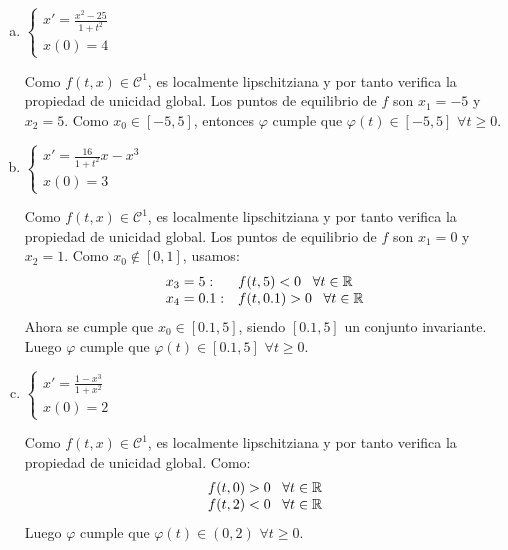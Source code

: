 \documentclass[12pt]{article}
\theoremstyle{definition}
\theoremstyle{remark}
\begin{document}
\begin{enumerate}[(a)]
\item $
\left\{
\begin{array}{l}
x'=\frac{x^2-25}{1+t^2}\\
x(0)=4
\end{array}
\right.
$

Como $f(t,x)\in\mathcal{C}^1$, es localmente lipschitziana y por tanto verifica la propiedad de unicidad global. Los puntos de equilibrio de $f$ son $x_1=-5$ y $x_2=5$. Como $x_0\in[-5,5]$, entonces $\varphi$ cumple que $\varphi(t)\in[-5,5]$ $\forall t\geq 0$.
\item $
\left\{
\begin{array}{l}
x'=\frac{16}{1+t^2}x-x^3\\
x(0)=3
\end{array}
\right.
$

Como $f(t,x)\in\mathcal{C}^1$, es localmente lipschitziana y por tanto verifica la propiedad de unicidad global. Los puntos de equilibrio de $f$ son $x_1=0$ y $x_2=1$. Como $x_0\notin[0,1]$, usamos:
\[
\begin{array}{ll}
x_3=5:& f(t,5)<0 \;\;\; \forall t\in\mathbb{R}\\
x_4=0.1: & f(t,0.1)>0 \;\;\; \forall t\in\mathbb{R}
\end{array}
\]
Ahora se cumple que $x_0\in[0.1,5]$, siendo $[0.1,5]$ un conjunto invariante. Luego $\varphi$ cumple que $\varphi(t)\in[0.1,5]$ $\forall t\geq 0$.

\item $
\left\{
\begin{array}{l}
x'=\frac{1-x^3}{1+x^2}\\
x(0)=2
\end{array}
\right.
$

Como $f(t,x)\in\mathcal{C}^1$, es localmente lipschitziana y por tanto verifica la propiedad de unicidad global. Como:
\[
\begin{array}{ll}
f(t,0)>0 \;\;\; \forall t\in\mathbb{R}\\
f(t,2)<0 \;\;\; \forall t\in\mathbb{R}
\end{array}
\]
Luego $\varphi$ cumple que $\varphi(t)\in(0,2)$ $\forall t\geq 0$.

\end{enumerate}
\end{document}
